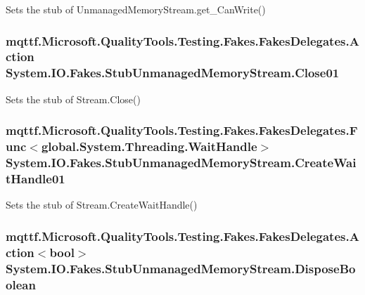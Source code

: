 Sets the stub of Unmanaged\-Memory\-Stream.\-get\-\_\-\-Can\-Write()

\hypertarget{class_system_1_1_i_o_1_1_fakes_1_1_stub_unmanaged_memory_stream_ad43e05d5f3194cf0252b490c3039feaf}{
\subsubsection[{Close01}]{\setlength{\rightskip}{0pt plus 5cm}mqttf.\-Microsoft.\-Quality\-Tools.\-Testing.\-Fakes.\-Fakes\-Delegates.\-Action System.\-I\-O.\-Fakes.\-Stub\-Unmanaged\-Memory\-Stream.\-Close01}}\label{class_system_1_1_i_o_1_1_fakes_1_1_stub_unmanaged_memory_stream_ad43e05d5f3194cf0252b490c3039feaf}


Sets the stub of Stream.\-Close()

\hypertarget{class_system_1_1_i_o_1_1_fakes_1_1_stub_unmanaged_memory_stream_aa9da9792c308b4c48b2736c2d29e5458}{
\subsubsection[{Create\-Wait\-Handle01}]{\setlength{\rightskip}{0pt plus 5cm}mqttf.\-Microsoft.\-Quality\-Tools.\-Testing.\-Fakes.\-Fakes\-Delegates.\-Func$<$global.\-System.\-Threading.\-Wait\-Handle$>$ System.\-I\-O.\-Fakes.\-Stub\-Unmanaged\-Memory\-Stream.\-Create\-Wait\-Handle01}}\label{class_system_1_1_i_o_1_1_fakes_1_1_stub_unmanaged_memory_stream_aa9da9792c308b4c48b2736c2d29e5458}


Sets the stub of Stream.\-Create\-Wait\-Handle()

\hypertarget{class_system_1_1_i_o_1_1_fakes_1_1_stub_unmanaged_memory_stream_a3b22fa9486b0f13f0d75120974e5a4af}{
\subsubsection[{Dispose\-Boolean}]{\setlength{\rightskip}{0pt plus 5cm}mqttf.\-Microsoft.\-Quality\-Tools.\-Testing.\-Fakes.\-Fakes\-Delegates.\-Action$<$bool$>$ System.\-I\-O.\-Fakes.\-Stub\-Unmanaged\-Memory\-Stream.\-Dispose\-Boolean}}\label{class_system_1_1_i_o_1_1_fakes_1_1_stub_unmanaged_memory_stream_a3b22fa9486b0f13f0d75120974e5a4af}


